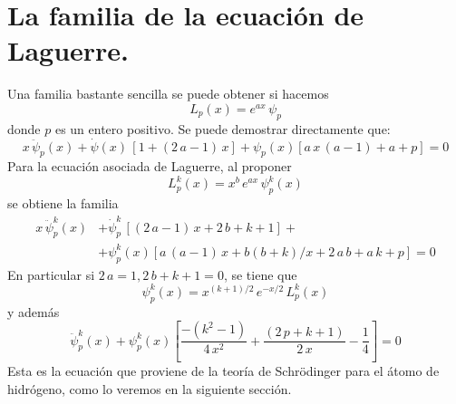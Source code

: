 \section{La familia de la ecuación de Laguerre.}
Una familia bastante sencilla se puede obtener si hacemos
\[ L_{p} (x) = e^{a x} \, \psi_{p} \]
donde $p$ es un entero positivo. Se puede demostrar directamente que:
\[ x \, \ddot{\psi}_{p} (x) + \dot{\psi} (x) \, [1 + (2 \, a -1) \, x] + \psi_{p} (x) [a \, x \, (a - 1) + a + p] = 0  \]
Para la ecuación asociada de Laguerre, al proponer
\[ L_{p}^{k} (x) = x^{b} \, e^{a x} \, \psi_{p}^{k} (x) \]
se obtiene la familia
\begin{align*}
x \, \ddot{\psi}_{p}^{k} (x) &+ \dot{\psi}_{p}^{k} \, [(2 \, a -1) \, x  + 2 \, b + k + 1] + \\
&+ \psi_{p}^{k} (x) [ a \, (a - 1) \, x + b (b + k) / x + 2 \, a \, b + a \, k + p] = 0
\end{align*}
En particular si $2 \, a = 1, 2 \, b + k + 1 = 0$, se tiene que
\begin{equation}
\psi_{p}^{k} (x) = x^{(k+1)/2} \, e^{-x/2} \, L_{p}^{k} (x)
\label{eq:ecuacion_08_80}
\end{equation}
y además
\begin{equation}
\ddot{\psi}_{p}^{k} (x) + \psi_{p}^{k} (x) \left[ \dfrac{-(k^{2} - 1)}{4 \, x^{2}} + \dfrac{(2 \, p + k + 1)}{2 \, x} - \dfrac{1}{4} \right] = 0
\label{eq:ecuacion_08_81}
\end{equation}
Esta es la ecuación que proviene de la teoría de Schrödinger para el átomo de hidrógeno, como lo veremos en la siguiente sección.
